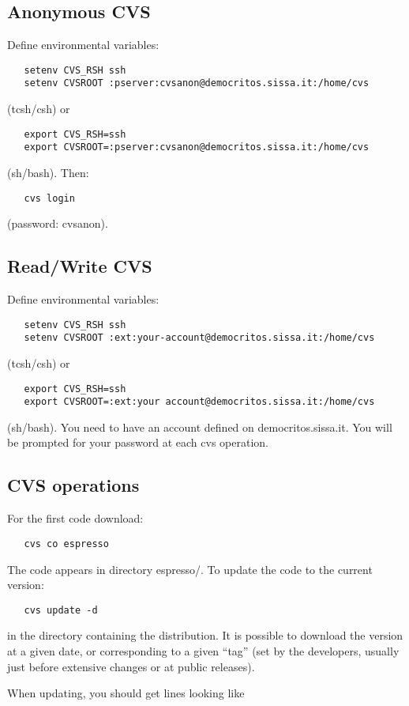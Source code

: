 \documentclass[12pt]{article}
\begin{document}
\subsection{Anonymous CVS}

Define environmental variables:
\begin{verbatim}
   setenv CVS_RSH ssh
   setenv CVSROOT :pserver:cvsanon@democritos.sissa.it:/home/cvs
\end{verbatim}
(tcsh/csh) or
\begin{verbatim}
   export CVS_RSH=ssh
   export CVSROOT=:pserver:cvsanon@democritos.sissa.it:/home/cvs
\end{verbatim}
(sh/bash). Then:
\begin{verbatim}
   cvs login
\end{verbatim}
(password: cvsanon).

\subsection{Read/Write CVS}

Define environmental variables:
\begin{verbatim}
   setenv CVS_RSH ssh
   setenv CVSROOT :ext:your-account@democritos.sissa.it:/home/cvs
\end{verbatim}
(tcsh/csh) or
\begin{verbatim}
   export CVS_RSH=ssh
   export CVSROOT=:ext:your account@democritos.sissa.it:/home/cvs
\end{verbatim}
(sh/bash). You need to have an account defined on democritos.sissa.it.
You will be prompted for your password at each cvs operation.

\subsection{CVS operations}

For the first code download:
\begin{verbatim}
   cvs co espresso
\end{verbatim}
The code appears in directory espresso/.
To update the code to the current version:
\begin{verbatim}
   cvs update -d
\end{verbatim}
in the directory containing the distribution. It is possible 
to download the version at a given date, or corresponding to 
a given ``tag'' (set by the developers, usually just before 
extensive changes or at public releases).

When updating, you should get lines looking like
\end{document}
